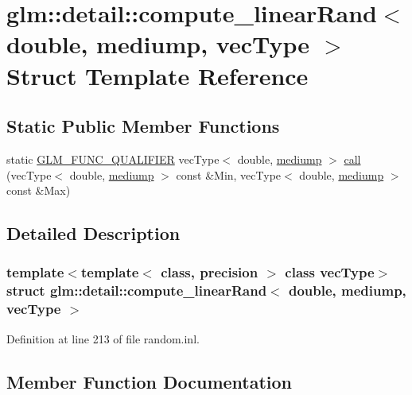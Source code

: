 \hypertarget{structglm_1_1detail_1_1compute__linear_rand_3_01double_00_01mediump_00_01vec_type_01_4}{}\section{glm\+::detail\+::compute\+\_\+linear\+Rand$<$ double, mediump, vec\+Type $>$ Struct Template Reference}
\label{structglm_1_1detail_1_1compute__linear_rand_3_01double_00_01mediump_00_01vec_type_01_4}
\subsection*{Static Public Member Functions}
\begin{DoxyCompactItemize}
\item 
static \mbox{\hyperlink{setup_8hpp_a33fdea6f91c5f834105f7415e2a64407}{G\+L\+M\+\_\+\+F\+U\+N\+C\+\_\+\+Q\+U\+A\+L\+I\+F\+I\+ER}} vec\+Type$<$ double, \mbox{\hyperlink{namespaceglm_a0f04f086094c747d227af4425893f545a6416f3ea0c9025fb21ed50c4d6620482}{mediump}} $>$ \mbox{\hyperlink{structglm_1_1detail_1_1compute__linear_rand_3_01double_00_01mediump_00_01vec_type_01_4_a031b3fa7e6d9050f4d038c13239a71a7}{call}} (vec\+Type$<$ double, \mbox{\hyperlink{namespaceglm_a0f04f086094c747d227af4425893f545a6416f3ea0c9025fb21ed50c4d6620482}{mediump}} $>$ const \&Min, vec\+Type$<$ double, \mbox{\hyperlink{namespaceglm_a0f04f086094c747d227af4425893f545a6416f3ea0c9025fb21ed50c4d6620482}{mediump}} $>$ const \&Max)
\end{DoxyCompactItemize}


\subsection{Detailed Description}
\subsubsection*{template$<$template$<$ class, precision $>$ class vec\+Type$>$\newline
struct glm\+::detail\+::compute\+\_\+linear\+Rand$<$ double, mediump, vec\+Type $>$}



Definition at line 213 of file random.\+inl.



\subsection{Member Function Documentation}
\mbox{\label{structglm_1_1detail_1_1compute__linear_rand_3_01double_00_01mediump_00_01vec_type_01_4_a031b3fa7e6d9050f4d038c13239a71a7}} 
